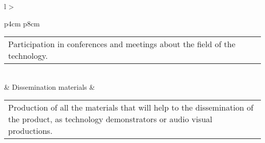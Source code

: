 \begin{longtable}[H]{l >{\raggedright\arraybackslash}p{4cm} p{8cm}}
\begin{tabular}[c]{@{}l@{}}
\begin{minipage}[t]{\linewidth}
	Participation in conferences and meetings about the field of the technology.
		\end{minipage} \end{tabular}
	\\  & Dissemination materials & 
				\begin{tabular}[c]{@{}l@{}}\begin{minipage}[t]{\linewidth}
		Production of all the materials that will help to the dissemination of the product, as technology demonstrators or audio visual productions.
		\end{minipage} \end{tabular}
	\\ \bottomrule[2pt]
	\caption{Activity list and description}
\end{longtable}